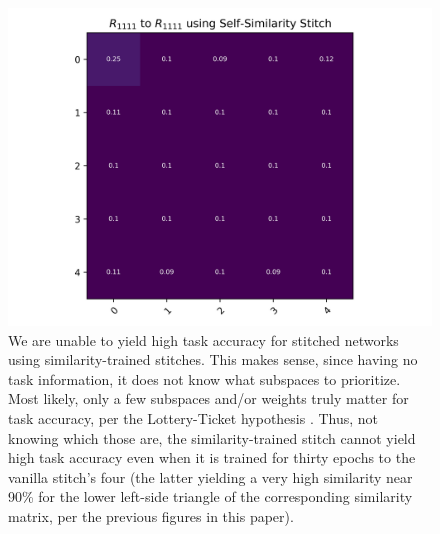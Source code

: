 \documentclass{article}
\begin{document}
\begin{center}
  \begin{figure}[H]
     \centering
     \includegraphics[width=14cm]{selfsim.png}
     \caption{We are unable to yield high task accuracy for stitched networks using
     similarity-trained stitches. This makes sense, since having no task information, it does
     not know what subspaces to prioritize. Most likely, only a few subspaces and/or weights
     truly matter for task accuracy, per the Lottery-Ticket hypothesis \cite{LotteryTicket}. Thus,
     not knowing which those are, the similarity-trained stitch cannot yield high task accuracy
     even when it is trained for thirty epochs to the vanilla stitch's four (the latter yielding
     a very high similarity near 90\% for the lower left-side triangle of the corresponding
     similarity matrix, per the previous figures in this paper).}
  \end{figure}
\end{center}
\end{document}
